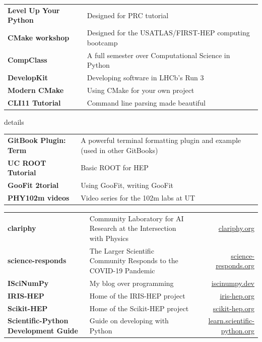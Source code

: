 \documentclass[10pt,letterpaper]{moderncv}
\begin{document}

\begin{tabularx}{\textwidth}{>{\bfseries}p{1.6in}X}
Level Up Your Python & Designed for PRC tutorial \\
CMake workshop & Designed for the USATLAS/FIRST-HEP computing bootcamp \\
CompClass & A full semester over Computational Science in Python \\
DevelopKit & Developing software in LHCb's Run 3 \\
Modern CMake & Using CMake for your own project \\
CLI11 Tutorial & Command line parsing made beautiful \\
\end{tabularx}

\begin{taggedblock}{details}
\begin{tabularx}{\textwidth}{>{\bfseries}p{1.6in}X}
GitBook Plugin: Term & A powerful terminal formatting plugin and example (used in other GitBooks) \\
UC ROOT Tutorial & Basic ROOT for HEP \\
GooFit 2torial & Using GooFit, writing GooFit \\
PHY102m videos & Video series for the 102m labs at UT \\
\end{tabularx}
\end{taggedblock}


\begin{tabularx}{\textwidth}{>{\bfseries}p{1.45in}Xr}
clariphy & Community Laboratory for AI Research at the Intersection with Physics & \url{clariphy.org} \\
science-responds & The Larger Scientific Community Responds to the COVID-19 Pandemic & \url{science-responds.org} \\
ISciNumPy & My blog over programming & \url{iscinumpy.dev} \\
IRIS-HEP & Home of the IRIS-HEP project & \url{iris-hep.org} \\
Scikit-HEP & Home of the Scikit-HEP project & \url{scikit-hep.org} \\
Scientific-Python Development Guide & Guide on developing with Python & \url{learn.scientific-python.org} \\
\end{tabularx}
\end{document}

